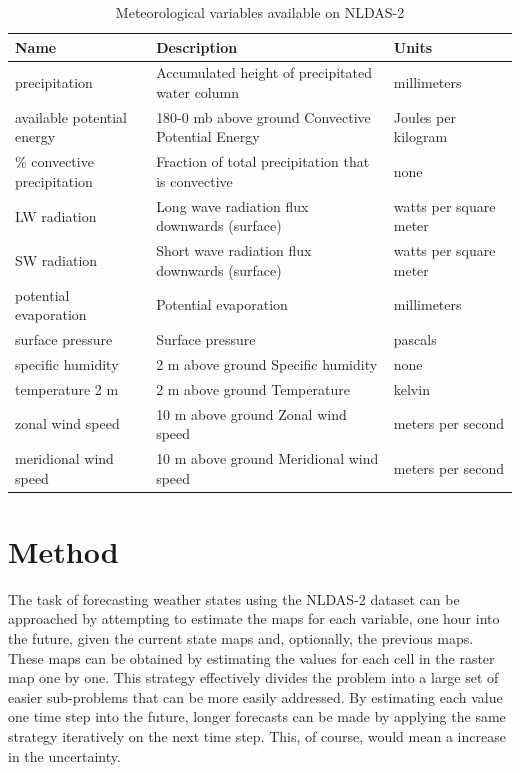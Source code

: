 \documentclass{article}
\begin{document}
\begin{table}[t]
\caption{Meteorological variables available on NLDAS-2}
\label{tab:variables}
\begin{tabular}{p{4cm} p{8cm} p{3.5cm}}
\hline
\textbf{Name} &\textbf{Description} &\textbf{Units} \\
\hline
precipitation &Accumulated height of precipitated water column &millimeters\\
available potential energy &180-0 mb above ground Convective Potential
Energy &Joules per kilogram \\
\% convective precipitation &Fraction of total precipitation that is convective
&none \\
LW radiation &Long wave radiation flux downwards (surface) &watts per square
meter \\
SW radiation &Short wave radiation flux downwards (surface) &watts per
square meter \\
potential evaporation &Potential evaporation &millimeters \\
surface pressure &Surface pressure &pascals \\
specific humidity &2 m above ground Specific humidity &none \\
temperature 2 m &2 m above ground Temperature &kelvin \\
zonal wind speed &10 m above ground Zonal wind speed &meters per second \\
meridional wind speed &10 m above ground Meridional wind speed &meters per
second \\
\hline
\end{tabular}
\end{table}

\section{Method}

The task of forecasting weather states using the NLDAS-2 dataset can be
approached by attempting to estimate the maps for each variable, one hour into
the future, given the current state maps and, optionally, the previous maps.
These maps can be obtained by estimating the values for each cell in the raster
map one by one. This strategy effectively divides the problem into a large set
of easier sub-problems that can be more easily addressed. By estimating each
value one time step into the future, longer forecasts can be made by applying
the same strategy iteratively on the next time step. This, of course, would mean
a increase in the uncertainty.
\end{document}
